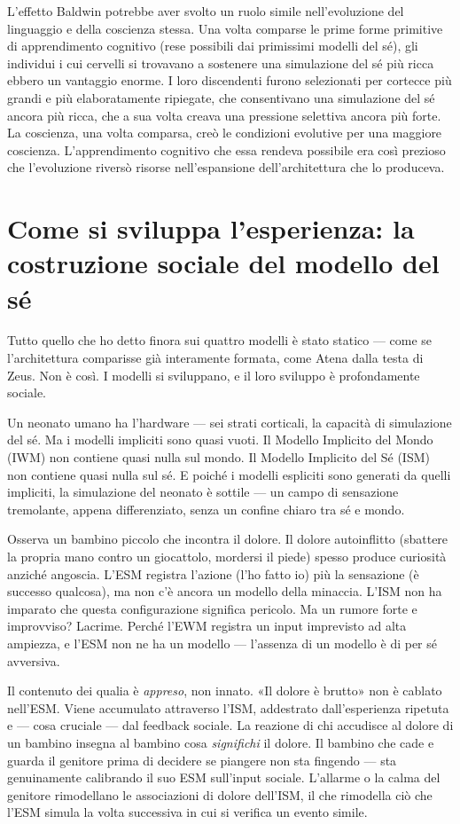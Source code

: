 \documentclass[11pt, twoside, openright]{book}
\begin{document}
L'effetto Baldwin potrebbe aver svolto un ruolo simile nell'evoluzione del linguaggio e della coscienza stessa. Una volta comparse le prime forme primitive di apprendimento cognitivo (rese possibili dai primissimi modelli del sé), gli individui i cui cervelli si trovavano a sostenere una simulazione del sé più ricca ebbero un vantaggio enorme. I loro discendenti furono selezionati per cortecce più grandi e più elaboratamente ripiegate, che consentivano una simulazione del sé ancora più ricca, che a sua volta creava una pressione selettiva ancora più forte. La coscienza, una volta comparsa, creò le condizioni evolutive per una maggiore coscienza. L'apprendimento cognitivo che essa rendeva possibile era così prezioso che l'evoluzione riversò risorse nell'espansione dell'architettura che lo produceva.

\section*{Come si sviluppa l'esperienza: la costruzione sociale del modello del sé}

Tutto quello che ho detto finora sui quattro modelli è stato statico --- come se l'architettura comparisse già interamente formata, come Atena dalla testa di Zeus. Non è così. I modelli si sviluppano, e il loro sviluppo è profondamente sociale.

Un neonato umano ha l'hardware --- sei strati corticali, la capacità di simulazione del sé. Ma i modelli impliciti sono quasi vuoti. Il Modello Implicito del Mondo (IWM) non contiene quasi nulla sul mondo. Il Modello Implicito del Sé (ISM) non contiene quasi nulla sul sé. E poiché i modelli espliciti sono generati da quelli impliciti, la simulazione del neonato è sottile --- un campo di sensazione tremolante, appena differenziato, senza un confine chiaro tra sé e mondo.

Osserva un bambino piccolo che incontra il dolore. Il dolore autoinflitto (sbattere la propria mano contro un giocattolo, mordersi il piede) spesso produce curiosità anziché angoscia. L'ESM registra l'azione (l'ho fatto io) più la sensazione (è successo qualcosa), ma non c'è ancora un modello della minaccia. L'ISM non ha imparato che questa configurazione significa pericolo. Ma un rumore forte e improvviso? Lacrime. Perché l'EWM registra un input imprevisto ad alta ampiezza, e l'ESM non ne ha un modello --- l'assenza di un modello è di per sé avversiva.

Il contenuto dei qualia è \textit{appreso}, non innato. «Il dolore è brutto» non è cablato nell'ESM. Viene accumulato attraverso l'ISM, addestrato dall'esperienza ripetuta e --- cosa cruciale --- dal feedback sociale. La reazione di chi accudisce al dolore di un bambino insegna al bambino cosa \textit{significhi} il dolore. Il bambino che cade e guarda il genitore prima di decidere se piangere non sta fingendo --- sta genuinamente calibrando il suo ESM sull'input sociale. L'allarme o la calma del genitore rimodellano le associazioni di dolore dell'ISM, il che rimodella ciò che l'ESM simula la volta successiva in cui si verifica un evento simile.
\end{document}
